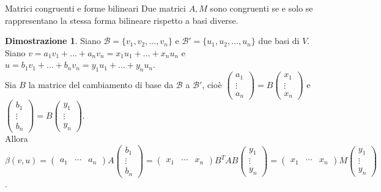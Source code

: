 \documentclass[a4paper]{article}
\theoremstyle{definition}
\newtheorem*{dimm}{Dimostrazione}
\begin{document}
	\begin{teo}{Matrici congruenti e forme bilineari}{}
		Due matrici $A, M$ sono congruenti se e solo se rappresentano la stessa forma bilineare rispetto a basi diverse.
	\end{teo}
	\begin{dimm}
		Siano $\mathcal{B} = \{v_1, v_2, ..., v_n\}$ e $\mathcal{B}' = \{u_1, u_2, ..., u_n\}$ due basi di $V$. \\
		Siano $v = a_1v_1 + ... + a_nv_n = x_1u_1 + ... + x_nu_n$ e $u = b_1v_1 + ... + b_nv_n = y_1u_1 + ... + y_nu_n$. \\
		Sia $B$ la matrice del cambiamento di base da $\mathcal{B}$ a $\mathcal{B}'$, cioè $\begin{pmatrix}
			a_1 \\
			\vdots \\
			a_n
		\end{pmatrix} = B \begin{pmatrix}
			x_1 \\
			\vdots \\
			x_n
		\end{pmatrix}$ e $\begin{pmatrix}
			b_1 \\
			\vdots \\
			b_n
		\end{pmatrix} = B \begin{pmatrix}
			y_1 \\
			\vdots \\
			y_n
		\end{pmatrix}$. \\
		Allora $\beta(v, u) = \begin{pmatrix}
			a_1 & \cdots & a_n
		\end{pmatrix}A \begin{pmatrix}
			b_1 \\
			\vdots \\
			b_n
		\end{pmatrix} = \begin{pmatrix}
			x_1 & \cdots & x_n
		\end{pmatrix}B^T A B \begin{pmatrix}
			y_1 \\
			\vdots \\
			y_n
		\end{pmatrix} = \begin{pmatrix}
			x_1 & \cdots & x_n
		\end{pmatrix} M \begin{pmatrix}
			y_1 \\
			\vdots \\
			y_n
		\end{pmatrix}$.
	\end{dimm}
\end{document}
